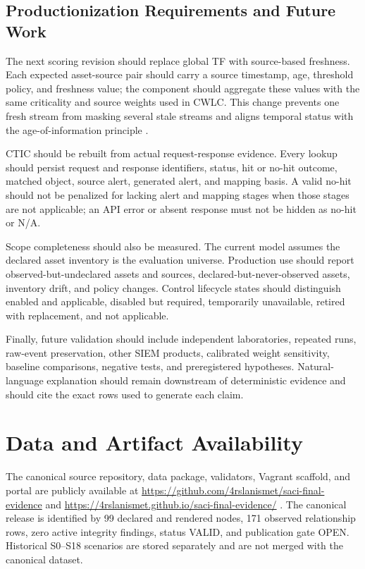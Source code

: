 \documentclass[a4paper,conference]{IEEEtran}
\begin{document}
\subsection{Productionization Requirements and Future Work}
The next scoring revision should replace global TF with source-based freshness. Each expected asset-source pair should carry a source timestamp, age, threshold policy, and freshness value; the component should aggregate these values with the same criticality and source weights used in CWLC. This change prevents one fresh stream from masking several stale streams and aligns temporal status with the age-of-information principle \cite{kaul2012}.

CTIC should be rebuilt from actual request-response evidence. Every lookup should persist request and response identifiers, status, hit or no-hit outcome, matched object, source alert, generated alert, and mapping basis. A valid no-hit should not be penalized for lacking alert and mapping stages when those stages are not applicable; an API error or absent response must not be hidden as no-hit or N/A.

Scope completeness should also be measured. The current model assumes the declared asset inventory is the evaluation universe. Production use should report observed-but-undeclared assets and sources, declared-but-never-observed assets, inventory drift, and policy changes. Control lifecycle states should distinguish enabled and applicable, disabled but required, temporarily unavailable, retired with replacement, and not applicable.

Finally, future validation should include independent laboratories, repeated runs, raw-event preservation, other SIEM products, calibrated weight sensitivity, baseline comparisons, negative tests, and preregistered hypotheses. Natural-language explanation should remain downstream of deterministic evidence and should cite the exact rows used to generate each claim.

\section{Data and Artifact Availability}
The canonical source repository, data package, validators, Vagrant scaffold, and portal are publicly available at \url{https://github.com/4rslanismet/saci-final-evidence} and \url{https://4rslanismet.github.io/saci-final-evidence/} \cite{arslan_artifact}. The canonical release is identified by 99 declared and rendered nodes, 171 observed relationship rows, zero active integrity findings, status VALID, and publication gate OPEN. Historical S0--S18 scenarios are stored separately and are not merged with the canonical dataset.
\end{document}
